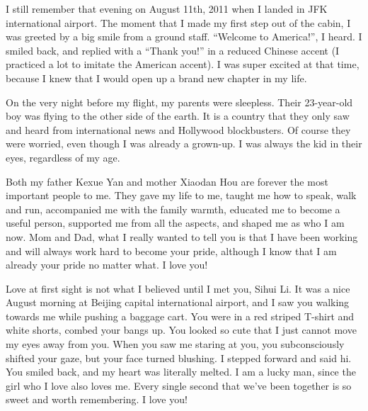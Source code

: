  
I still remember that evening on August 11th, 2011 when I landed in JFK international airport. The moment that I made my first step out of the cabin, I was greeted by a big smile from a ground staff. ``Welcome to America!'', I heard. I smiled back, and replied with a ``Thank you!'' in a reduced Chinese accent (I practiced a lot to imitate the American accent). I was super excited at that time, because I knew that I would open up a brand new chapter in my life. 

On the very night before my flight, my parents were sleepless. Their 23-year-old boy was flying to the other side of the earth. It is a country that they only saw and heard from international news and Hollywood blockbusters. Of course they were worried, even though I was already a grown-up. I was always the kid in their eyes, regardless of my age.

Both my father Kexue Yan and mother Xiaodan Hou are forever the most important people to me. They gave my life to me, taught me how to speak, walk and run, accompanied me with the family warmth, educated me to become a useful person, supported me from all the aspects, and shaped me as who I am now. Mom and Dad, what I really wanted to tell you is that I have been working and will always work hard to become your pride, although I know that I am already your pride no matter what. I love you!   

Love at first sight is not what I believed until I met you, Sihui Li. It was a nice August morning at Beijing capital international airport, and I saw you walking towards me while pushing a baggage cart. You were in a red striped T-shirt and white shorts, combed your bangs up. You looked so cute that I just cannot move my eyes away from you. When you saw me staring at you, you subconsciously shifted your gaze, but your face turned blushing. I stepped forward and said hi. You smiled back, and my heart was literally melted.  I am a lucky man, since the girl who I love also loves me. Every single second that we've been together is so sweet and worth remembering. I love you! 

